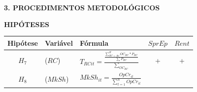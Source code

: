 \documentclass[ignorenonframetext,aspectratio=169,ignorenonframetext]{beamer}
\begin{document}
\begin{frame}{\textbf{3. PROCEDIMENTOS METODOLÓGICOS}}
\protect\hypertarget{procedimentos-metodoluxf3gicos-10}{}

\textbf{HIPÓTESES}

\begin{longtable}[]{@{}cllcc@{}}
\toprule
\begin{minipage}[b]{0.11\columnwidth}\centering
Hipótese\strut
\end{minipage} & \begin{minipage}[b]{0.15\columnwidth}\raggedright
Variável\strut
\end{minipage} & \begin{minipage}[b]{0.39\columnwidth}\raggedright
Fórmula\strut
\end{minipage} & \begin{minipage}[b]{0.11\columnwidth}\centering
\(SprEp\)\strut
\end{minipage} & \begin{minipage}[b]{0.11\columnwidth}\centering
\(Rent\)\strut
\end{minipage}\tabularnewline
\midrule
\endhead
\begin{minipage}[t]{0.11\columnwidth}\centering
\(H_{7}\)\strut
\end{minipage} & \begin{minipage}[t]{0.15\columnwidth}\raggedright
(\(RC\))\strut
\end{minipage} & \begin{minipage}[t]{0.39\columnwidth}\raggedright
\(T_{RCit} = \frac{\frac{\sum_{RC = Aa}^HOC_{RC}*P_{RC}}{\sum_{}P_{RC}}}{\sum_{OC_{RC}}}\)\strut
\end{minipage} & \begin{minipage}[t]{0.11\columnwidth}\centering
+\strut
\end{minipage} & \begin{minipage}[t]{0.11\columnwidth}\centering
+\strut
\end{minipage}\tabularnewline
\begin{minipage}[t]{0.11\columnwidth}\centering
\(H_{8}\)\strut
\end{minipage} & \begin{minipage}[t]{0.15\columnwidth}\raggedright
(\(MkSh\))\strut
\end{minipage} & \begin{minipage}[t]{0.39\columnwidth}\raggedright
\(MkSh_{it} = \frac{OpCr_{it}}{\sum_{t=1}^nOpCr_{it}}\)\strut
\end{minipage} & \begin{minipage}[t]{0.11\columnwidth}\centering

\end{minipage}
\end{longtable}
\end{frame}
\end{document}
